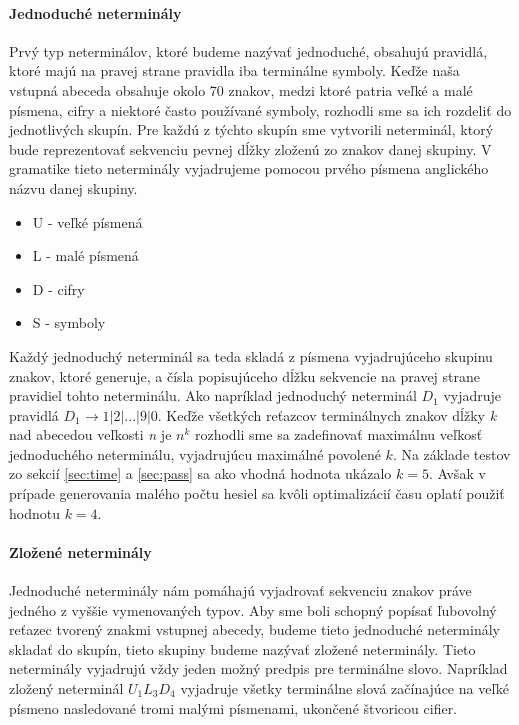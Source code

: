 \paragraph{Jednoduché neterminály}
Prvý typ neterminálov, ktoré budeme nazývať jednoduché, obsahujú pravidlá, ktoré majú na pravej strane pravidla iba terminálne symboly. Keďže naša vstupná abeceda obsahuje okolo 70 znakov, medzi ktoré patria veľké a malé písmena, cifry a niektoré často používané symboly, rozhodli sme sa ich rozdeliť do jednotlivých skupín. Pre každú z týchto skupín sme vytvorili neterminál, ktorý bude reprezentovať sekvenciu pevnej dĺžky zloženú zo znakov danej skupiny. V gramatike tieto neterminály vyjadrujeme pomocou prvého písmena anglického názvu danej skupiny.
\begin{itemize}
	\item U - veľké písmená
	\item L - malé písmená
	\item D - cifry
	\item S - symboly
\end{itemize}
Každý jednoduchý neterminál sa teda skladá z písmena vyjadrujúceho skupinu znakov, ktoré generuje, a čísla popisujúceho dĺžku sekvencie na pravej strane pravidiel tohto neterminálu. Ako napríklad jednoduchý neterminál \(D_1\) vyjadruje pravidlá \(D_1 \to 1 | 2 | ... | 9 | 0 \). Keďže všetkých reťazcov terminálnych znakov dĺžky \emph{k} nad abecedou veľkosti \emph{n} je \( n^k\) rozhodli sme sa zadefinovať maximálnu veľkosť jednoduchého neterminálu, vyjadrujúcu maximálné povolené \(k\). Na základe testov zo sekcií \ref{sec:time} a \ref{sec:pass} sa ako vhodná hodnota ukázalo \(k = 5\). Avšak v prípade generovania malého počtu hesiel sa kvôli optimalizácií času oplatí použiť hodnotu \(k = 4\).

\paragraph{Zložené neterminály}
Jednoduché neterminály nám pomáhajú vyjadrovať sekvenciu znakov práve jedného z vyššie vymenovaných typov. Aby sme boli schopný popísať ľubovolný reťazec tvorený znakmi vstupnej abecedy, budeme tieto jednoduché neterminály skladať do skupín, tieto skupiny budeme nazývať zložené neterminály. Tieto neterminály vyjadrujú vždy jeden možný predpis pre terminálne slovo. Napríklad zložený neterminál \(U_1L_3D_4\) vyjadruje všetky terminálne slová začínajúce na veľké písmeno nasledované tromi malými písmenami, ukončené štvoricou cifier.

